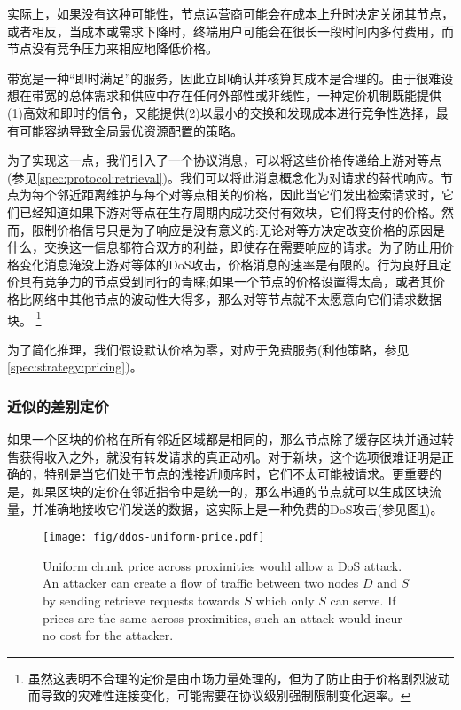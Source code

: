 实际上，如果没有这种可能性，节点运营商可能会在成本上升时决定关闭其节点，或者相反，当成本或需求下降时，终端用户可能会在很长一段时间内多付费用，而节点没有竞争压力来相应地降低价格。 

带宽是一种“即时满足”的服务，因此立即确认并核算其成本是合理的。由于很难设想在带宽的总体需求和供应中存在任何外部性或非线性，一种定价机制既能提供(1)高效和即时的信令，又能提供(2)以最小的交换和发现成本进行竞争性选择，最有可能容纳导致全局最优资源配置的策略。

为了实现这一点，我们引入了一个协议消息，可以将这些价格传递给上游对等点(参见\ref{spec:protocol:retrieval})。我们可以将此消息概念化为对请求的替代响应。节点为每个邻近距离维护与每个对等点相关的价格，因此当它们发出检索请求时，它们已经知道如果下游对等点在生存周期内成功交付有效块，它们将支付的价格。然而，限制价格信号只是为了响应是没有意义的:无论对等方决定改变价格的原因是什么，交换这一信息都符合双方的利益，即使存在需要响应的请求。为了防止用价格变化消息淹没上游对等体的DoS攻击，价格消息的速率是有限的。行为良好且定价具有竞争力的节点受到同行的青睐;如果一个节点的价格设置得太高，或者其价格比网络中其他节点的波动性大得多，那么对等节点就不太愿意向它们请求数据块。%
%
\footnote{虽然这表明不合理的定价是由市场力量处理的，但为了防止由于价格剧烈波动而导致的灾难性连接变化，可能需要在协议级别强制限制变化速率。 }

为了简化推理，我们假设默认价格为零，对应于免费服务(利他策略，参见\ref{spec:strategy:pricing})。 

\subsubsection{近似的差别定价}\label{sec:diff-pricing-prox}

如果一个区块的价格在所有邻近区域都是相同的，那么节点除了缓存区块并通过转售获得收入之外，就没有转发请求的真正动机。对于新块，这个选项很难证明是正确的，特别是当它们处于节点的浅接近顺序时，它们不太可能被请求。更重要的是，如果区块的定价在邻近指令中是统一的，那么串通的节点就可以生成区块流量，并准确地接收它们发送的数据，这实际上是一种免费的DoS攻击(参见图\ref{fig:ddos-uniform-price})。

\begin{figure}[htbp]
   \centering
   \texttt{[image: fig/ddos-uniform-price.pdf]}
   \caption[Uniform chunk price across proximities would allow a DoS \statusgreen]{Uniform chunk price across proximities would allow a DoS attack. An attacker can create a flow of traffic between two nodes $D$ and $S$ by sending retrieve requests towards $S$ which only $S$ can serve. If prices are the same across proximities, such an attack would incur no cost for the attacker.}
   \label{fig:ddos-uniform-price}
\end{figure}

